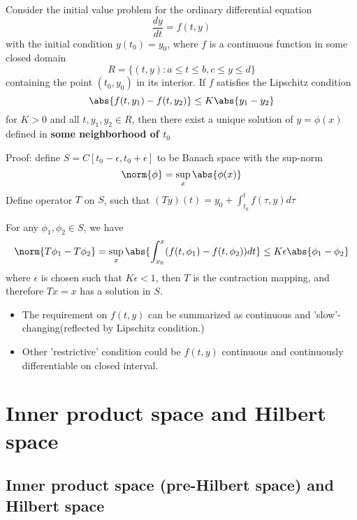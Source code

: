 \begin{refsection}
\begin{theorem}
	\cite[228]{debnath2005hilbert} Consider the initial value problem for the ordinary differential equation 
	$$\frac{dy}{dt} = f(t,y)$$
	with the initial condition $y(t_0) = y_0$, where $f$ is a continuous function in some closed domain
	$$R = \{(t,y): a\leq t \leq b,c\leq y\leq d\}$$
	containing the point $(t_0,y_0)$ in its interior. If $f$ satisfies the Lipschitz condition
	$$\abs{f(t,y_1) - f(t,y_2)} \leq K\abs{y_1-y_2}$$
	for $K>0$ and all $t,y_1,y_2 \in R$, then there exist a unique solution of $y=\phi(x)$ defined in \textbf{some neighborhood of $t_0$}
\end{theorem}
Proof: define $S = C[t_0-\epsilon,t_0+\epsilon]$ to be Banach space with the sup-norm
$$\norm{\phi} = \sup_x \abs{\phi(x)}$$
Define operator $T$ on $S$, such that $(Ty)(t) = y_0 + \int_{t_0}^t f(\tau,y) d\tau$

For any $\phi_1,\phi_2\in S$, we have
$$\norm{T\phi_1 - T\phi_2} = \sup_x \abs{\int_{x_0}^x(f(t,\phi_1) - f(t,\phi_2))dt} \leq K\epsilon \abs{\phi_1-\phi_2}$$
where $\epsilon$ is chosen such that $K\epsilon <1$, then $T$ is the contraction mapping, and therefore $Tx=x$ has a solution in $S$.


\begin{remark}\hfill
	\begin{itemize}
		\item The requirement on $f(t,y)$ can be summarized as continuous and 'slow'-changing(reflected by Lipschitz condition.)
		\item Other 'restrictive' condition could be $f(t,y)$ continuous and continuously differentiable on closed interval.
	\end{itemize}
\end{remark}





\section{Inner product space and Hilbert space}\label{ch:functional-analysis:sec:hilbert-space}
\subsection{Inner product space (pre-Hilbert space) and Hilbert space}\label{ch:functional-analysis:sec:inner-product-space-pre-hilbert-space}

\end{refsection}
